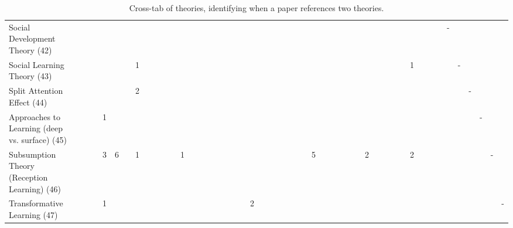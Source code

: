 \begin{table*}[t]
\begin{tabular}{llllllllllllllllllllllllllllllllllllllllllllllll}
Social Development Theory (42) & &&&&&&&&&&&&&&&&&&&&&&&&&&&&&&&&&&&&&&&&&-&&&&&\\
Social Learning Theory (43) & &&&&&&1&&&&&&&&&&&&&&&&&&&&&&&&&&&&&&&1&&&&&-&&&&\\
Split Attention Effect (44) & &&&&&&2&&&&&&&&&&&&&&&&&&&&&&&&&&&&&&&&&&&&&-&&&\\
Approaches to Learning (deep vs. surface) (45) & &&&1&&&&&&&&&&&&&&&&&&&&&&&&&&&&&&&&&&&&&&&&&-&&\\
Subsumption Theory (Reception Learning) (46) & &&&3&6&&1&&&&&1&&&&&&&&&&&&&&&5&&&&&&2&&&&&2&&&&&&&&-&\\
Transformative Learning (47) & &&&1&&&&&&&&&&&&&&&&2&&&&&&&&&&&&&&&&&&&&&&&&&&&-\\
\end{tabular}
\caption{Cross-tab of theories, identifying when a paper references two theories.}
\end{table*}